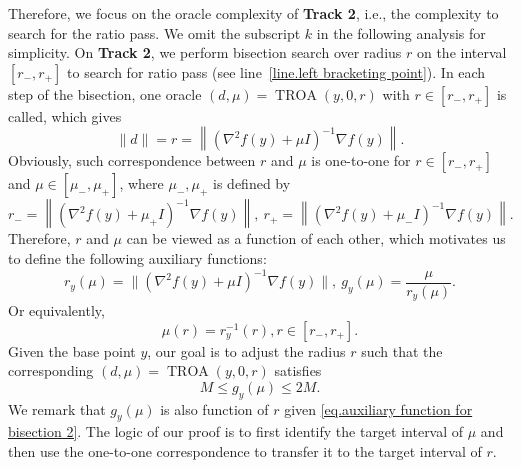 \documentclass{mcom-l}
\numberwithin{equation}{section}
\begin{document}
Therefore, we focus on the oracle complexity of \textbf{Track 2}, i.e., the complexity to search for the ratio pass. We omit the subscript $k$ in the following analysis for simplicity.
On \textbf{Track 2}, we perform bisection search over radius $r$ on the interval $[r_-,r_+]$ to search for ratio pass (see line~\ref{line.left bracketing point}). In each step of the bisection, one oracle $(d,\mu)=\operatorname{TROA}(y,0,r)$ with $r\in[r_-,r_+]$ is called, which gives
\begin{equation}
    \label{eq.correspondence}
    \|d\|=r=\left\|\left(\nabla^2 f(y)+\mu I\right)^{-1}\nabla f(y)\right\|.
\end{equation}
Obviously, such correspondence between $r$ and $\mu$ is one-to-one for $r\in[r_-,r_+]$ and $\mu\in[\mu_-,\mu_+]$, where $\mu_-,\mu_+$ is defined by
\begin{equation}
    \label{eq.endpoint correspondence}
    r_- = \left\|\left(\nabla^2 f(y)+\mu_+ I\right)^{-1}\nabla f(y)\right\|, \ r_+=\left\|\left(\nabla^2 f(y)+\mu_- I\right)^{-1}\nabla f(y)\right\|.
\end{equation}
Therefore, $r$ and $\mu$ can be viewed as a function of each other,  which motivates us to define the following auxiliary functions:
\begin{equation}
    \label{eq.auxiliary function for bisection}
    r_y(\mu)=\|\left (\nabla^2 f(y)+\mu I\right)^{-1}\nabla f(y)\|,\  g_y(\mu) = \frac{\mu}{r_y(\mu)}.
\end{equation}
Or equivalently,
\begin{equation}
    \label{eq.auxiliary function for bisection 2}
    \mu(r) = r_y^{-1}(r), r\in[r_-,r_+].
\end{equation}
Given the base point $y$, our goal is to adjust the radius $r$ such that the corresponding $(d,\mu)=\operatorname{TROA}(y,0,r)$ satisfies
\begin{equation*}
    M \leq g_y(\mu) \leq 2M.
\end{equation*}
We remark that $g_y(\mu)$ is also function of $r$ given \eqref{eq.auxiliary function for bisection 2}. The logic of our proof is to first identify the target interval of $\mu$ and then use the one-to-one correspondence to transfer it to the target interval of $r$.
\end{document}
